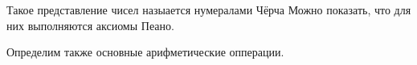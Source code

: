 \documentclass[lambda.tex]{subfiles}
\begin{document}
Такое представление чисел назыается нумералами Чёрча
Можно показать, что для них выполняются аксиомы Пеано.

Определим также основные арифметические опперации. 




\end{document}
